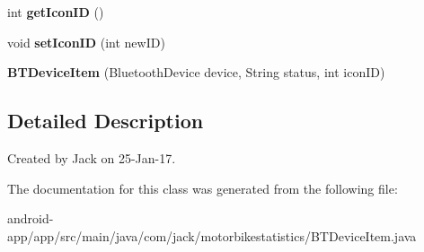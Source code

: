 \begin{DoxyCompactItemize}
int {\bfseries get\+Icon\+ID} ()
\item 
\mbox{\label{classcom_1_1jack_1_1motorbikestatistics_1_1_b_t_device_item_a40eb2a1f46700690d2327bf37bc5ed0e}} 
void {\bfseries set\+Icon\+ID} (int new\+ID)
\item 
\mbox{\label{classcom_1_1jack_1_1motorbikestatistics_1_1_b_t_device_item_addc508fe41b31b9e13a9105464a627ac}} 
{\bfseries B\+T\+Device\+Item} (Bluetooth\+Device device, String status, int icon\+ID)
\end{DoxyCompactItemize}


\subsection{Detailed Description}
Created by Jack on 25-\/\+Jan-\/17. 

The documentation for this class was generated from the following file\+:\begin{DoxyCompactItemize}
\item 
android-\/app/app/src/main/java/com/jack/motorbikestatistics/B\+T\+Device\+Item.\+java\end{DoxyCompactItemize}
